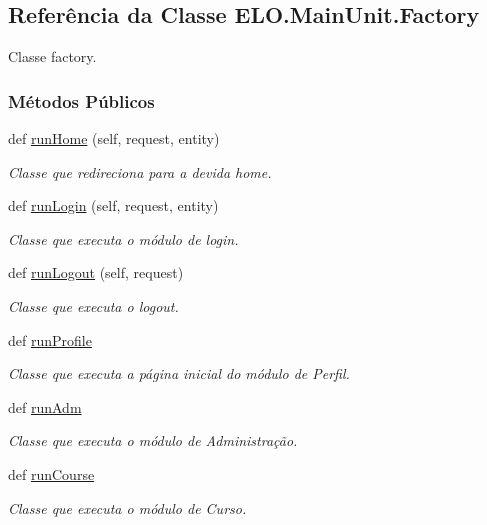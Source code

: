 \hypertarget{classELO_1_1MainUnit_1_1Factory}{}\subsection{Referência da Classe E\+L\+O.\+Main\+Unit.\+Factory}
\label{classELO_1_1MainUnit_1_1Factory}


Classe factory.  


\subsubsection*{Métodos Públicos}
\begin{DoxyCompactItemize}
\item 
def \hyperlink{classELO_1_1MainUnit_1_1Factory_abb90458d8f89dd0fbfefcab94e9f023f}{run\+Home} (self, request, entity)
\begin{DoxyCompactList}\small\item\em Classe que redireciona para a devida home. \end{DoxyCompactList}\item 
def \hyperlink{classELO_1_1MainUnit_1_1Factory_a2d2e0e20ae0e92c1598c0fcab23a705a}{run\+Login} (self, request, entity)
\begin{DoxyCompactList}\small\item\em Classe que executa o módulo de login. \end{DoxyCompactList}\item 
def \hyperlink{classELO_1_1MainUnit_1_1Factory_a3cf09225adad89e9802b3df03f39f86b}{run\+Logout} (self, request)
\begin{DoxyCompactList}\small\item\em Classe que executa o logout. \end{DoxyCompactList}\item 
def \hyperlink{classELO_1_1MainUnit_1_1Factory_ab20a76f74180fc77c6b8fcd8de7942f1}{run\+Profile}
\begin{DoxyCompactList}\small\item\em Classe que executa a página inicial do módulo de Perfil. \end{DoxyCompactList}\item 
def \hyperlink{classELO_1_1MainUnit_1_1Factory_a533b402a54bf6f6715824a8687fa7a24}{run\+Adm}
\begin{DoxyCompactList}\small\item\em Classe que executa o módulo de Administração. \end{DoxyCompactList}\item 
def \hyperlink{classELO_1_1MainUnit_1_1Factory_a5e360bc5396fd576e0614b9e157b3816}{run\+Course}
\begin{DoxyCompactList}\small\item\em Classe que executa o módulo de Curso. \end{DoxyCompactList}\end{DoxyCompactItemize}


